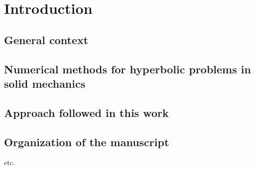 \chapter{Introduction}

\section{General context}
%


\section{Numerical methods for hyperbolic problems in solid mechanics}
%


\section{Approach followed in this work}
%

\section{Organization of the manuscript}
etc.











